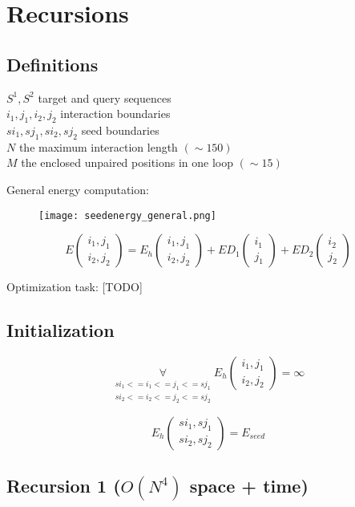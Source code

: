 \section{Recursions}

\subsection{Definitions}

$S^1, S^2$ target and query sequences\\
$i_1, j_1, i_2, j_2$ interaction boundaries\\
$si_1, sj_1, si_2, sj_2$ seed boundaries\\
$N$ the maximum interaction length $(\sim 150)$\\
$M$ the enclosed unpaired positions in one loop $(\sim 15)$

General energy computation:

\begin{figure}[H]
	\centering
	\texttt{[image: seedenergy\_general.png]}
\end{figure}

\begin{equation*}
E(\substack{i_1,j_1\\i_2,j_2}) = E_{h}(\substack{i_1,j_1\\i_2,j_2}) + ED_{1}(\substack{i_1\\j_1}) + ED_{2}(\substack{i_2\\j_2})
\end{equation*}

Optimization task: [TODO]

\subsection{Initialization}

\begin{equation*}
\underset{{\substack{si_1 <= i_{1} <= j_{1} <= sj_{1}\\si_2 <= i_{2} <= j_{2} <= sj_{2}}}}{\forall} E_h(\substack{i_1,j_1\\i_2,j_2}) = \infty
\end{equation*}

\begin{equation*}
E_h(\substack{si_1,sj_1\\si_2,sj_2}) = E_{seed}
\end{equation*}

\clearpage

\subsection{Recursion 1 ($O(N^{4})$ space + time)}

